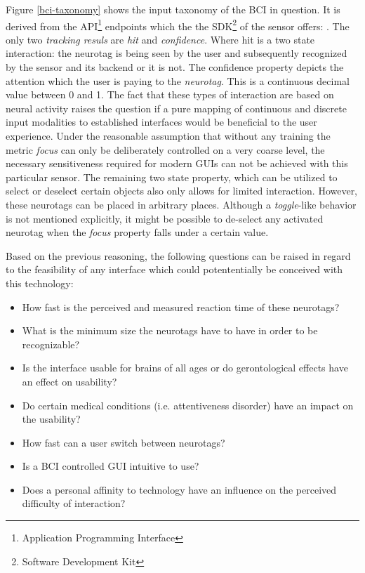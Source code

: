             Figure \ref*{bci-taxonomy} shows the input taxonomy of the BCI in question. It is derived from the API\footnote{Application Programming Interface} endpoints which the the SDK\footnote{Software Development Kit} of the sensor offers: \cite{NextMind.18112020}
            . The only two \textit{tracking resuls} are \textit{hit} and \textit{confidence}. Where hit is a two state interaction: the neurotag is being seen by the user and subsequently recognized by the sensor and its backend or it is not. The confidence property depicts the attention which the user is paying to the \textit{neurotag}. This is a continuous decimal value between 0 and 1.
            The fact that these types of interaction are based on neural activity raises the question if a pure mapping of continuous and discrete input modalities to established interfaces would be beneficial to the user experience. Under the reasonable assumption that without any training the metric \textit{focus} can only be deliberately controlled on a very coarse level, the necessary sensitiveness required for modern GUIs can not be achieved with this particular sensor. The remaining two state property, which can be utilized to select or deselect certain objects also only allows for limited interaction. However, these neurotags can be placed in arbitrary places. Although a \textit{toggle}-like behavior is not mentioned explicitly, it might be possible to de-select any activated neurotag when the \textit{focus} property falls under a certain value.

            \bigskip

            Based on the previous reasoning, the following questions can be raised in regard to the feasibility of any interface which could potententially be conceived with this technology:

            \begin{itemize}
                \item How fast is the perceived and measured reaction time of these neurotags?
                \item What is the minimum size the neurotags have to have in order to be recognizable?
                \item Is the interface usable for brains of all ages or do gerontological effects have an effect on usability?
                \item Do certain medical conditions (i.e. attentiveness disorder) have an impact on the usability?
                \item How fast can a user switch between neurotags?
                \item Is a BCI controlled GUI intuitive to use?
                \item Does a personal affinity to technology have an influence on the perceived difficulty of interaction?
            \end{itemize}

